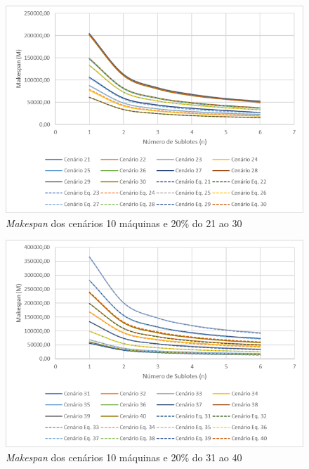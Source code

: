 \begin{figure}[H]
    \centering
     \includegraphics[width=13cm]{Apendices/Figuras/10m20_21-30.png}
     \caption{\textit{Makespan} dos cenários 10 máquinas e 20\% do 21 ao 30}
    \label{fig:10m20_21-30}
\end{figure}

\begin{figure}[H]
    \centering
     \includegraphics[width=13cm]{Apendices/Figuras/10m20_31-40.png}
     \caption{\textit{Makespan} dos cenários 10 máquinas e 20\% do 31 ao 40}
    \label{fig:10m20_31-40}
\end{figure}

